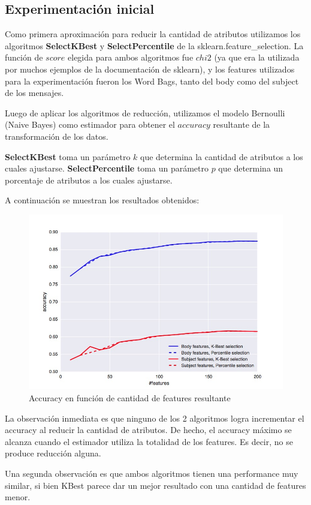 \subsection{Experimentación inicial}

Como primera aproximación para reducir la cantidad de atributos utilizamos los algoritmos \textbf{SelectKBest} y \textbf{SelectPercentile} de
la sklearn.feature\_selection. La función de \( score \) elegida para ambos algoritmos fue \( chi2 \) (ya que era la 
utilizada por muchos ejemplos de la documentación de sklearn), y los features utilizados para la
experimentación fueron los Word Bags, tanto del body como del subject de los mensajes.

Luego de aplicar los algoritmos de reducción, utilizamos el modelo Bernoulli (Naive Bayes) como estimador para obtener el \( accuracy \) resultante
de la transformación de los datos.

\textbf{SelectKBest} toma un parámetro \( k \) que determina la cantidad de atributos a los cuales ajustarse.
\textbf{SelectPercentile} toma un parámetro \( p \) que determina un porcentaje de atributos a los cuales ajustarse.

A continuación se muestran los resultados obtenidos:

\begin{figure}
	\centerline{\includegraphics[scale=0.4]{figures/bernoulli_reduced_dimensionality.jpg}}
	\caption{Accuracy en función de cantidad de features resultante}
\end{figure}

La observación inmediata es que ninguno de los 2 algoritmos logra incrementar el accuracy al reducir la cantidad de atributos. De hecho, el accuracy máximo
se alcanza cuando el estimador utiliza la totalidad de los features. Es decir, no se produce reducción alguna.

Una segunda observación es que ambos algoritmos tienen una performance muy similar, si bien KBest parece dar un mejor resultado con una cantidad
de features menor.
